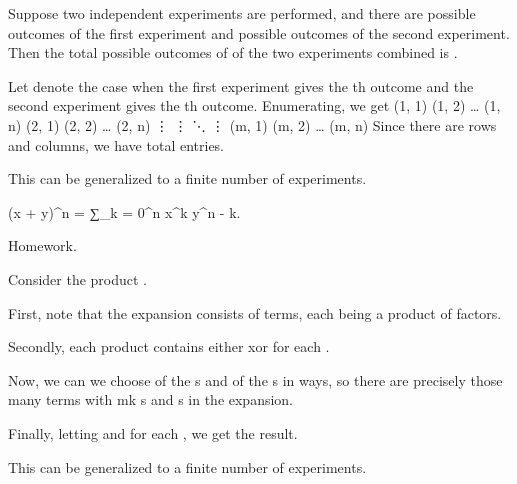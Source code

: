 \startchapter [title={Counting}]

	\startproposition[title={Basic principle of counting}]
		Suppose two independent experiments are performed, and there are  possible outcomes of the first experiment and  possible outcomes of the second experiment. Then the total possible outcomes of of the two experiments combined is .
	\stopproposition
	
	\startproof
		Let  denote the case when the first experiment gives the th outcome and the second experiment gives the th outcome. Enumerating, we get
		\startformula  \startmatrix[n=4]
			\NC  (1, 1)  \NC  (1, 2)  \NC  …  \NC  (1, n)  \NR
			\NC  (2, 1)  \NC  (2, 2)  \NC  …  \NC  (2, n)  \NR
			\NC  ⋮       \NC  ⋮       \NC  ⋱  \NC  ⋮       \NR
			\NC  (m, 1)  \NC  (m, 2)  \NC  …  \NC  (m, n)  \NR
		\stopmatrix	 \stopformula
		Since there are  rows and  columns, we have total  entries.
	\stopproof

	\startremark
		This can be generalized to a finite number of experiments.
	\stopremark


	\starttheorem [title={Binomial theorem}]
		\startformula
			(x + y)^n = ∑_{k = 0}^n  x^k y^{n - k}.
		\stopformula
	\stoptheorem
	
	\startproof [title={Inductive}]
		Homework.
	\stopproof

	\startproof [title={Combinatorial}]
		Consider the product .

		First, note that the expansion consists of  terms, each being a product of  factors.

		Secondly, each product contains either  xor  for each .


		Now, we can we choose  of the s and  of the s in  ways, so there are precisely those many terms with m{k} s and  s in the expansion.

		Finally, letting  and  for each , we get the result.
	\stopproof

	\startremark
		This can be generalized to a finite number of experiments.
	\stopremark


\stopchapter
